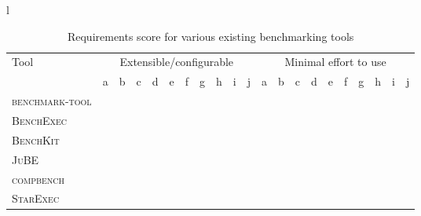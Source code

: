 \begin{table}
    \caption{Requirements score for various existing benchmarking tools}
    \label{tab:reqscoresummary}
    \begin{threeparttable}
        \begin{adjustbox}{max width=\textwidth}
            \begin{tabular}{l}
                \begin{tabular}{l | cccccccccc | cccccccccc}
                    \toprule
                    \multirow{2}{*}{Tool} &
                        \multicolumn{10}{c|}{Extensible/configurable} &
                        \multicolumn{10}{c}{Minimal effort to use}\\
                        & a & b & c & d & e & f & g & h & i & j &
                        a & b & c & d & e & f & g & h & i & j\\
                    \midrule
                    \textsc{benchmark-tool} &
                        & \checkmark & \checkmark & \checkmark & \checkmark & \checkmark & \checkmark & & \checkmark & \checkmark &
                        \checkmark & \checkmark & & & & \checkmark & & & &\\
                    \textsc{BenchExec} &
                        & & & \checkmark & \checkmark & & \checkmark & & \checkmark & &
                        \checkmark & \checkmark & \checkmark & \checkmark & & & & & \checkmark & \checkmark\\
                    \textsc{BenchKit} &
                        & \checkmark & & & \checkmark & & \checkmark & & \checkmark & &
                        & \checkmark & \checkmark & & & & & & \checkmark &\\
                    \textsc{JuBE} &
                        \checkmark & \checkmark & & \checkmark & \checkmark & \checkmark & \checkmark & \checkmark & \checkmark & \checkmark &
                        \checkmark & \checkmark & \checkmark & \checkmark & \checkmark & \checkmark & \checkmark & \checkmark & &\\
                    \textsc{compbench} &
                        \checkmark & \checkmark & & \checkmark & \checkmark & & \checkmark & \checkmark & \checkmark & &
                        \checkmark & & & & & \checkmark & & \checkmark & \checkmark &\\
                    \textsc{StarExec} &
                        \checkmark & \checkmark & \checkmark & & \checkmark & & \checkmark & & \checkmark & \checkmark &
                        \checkmark & \checkmark & \checkmark & \checkmark & & \checkmark & \checkmark & \checkmark & \checkmark & \checkmark\\

\end{tabular}
\end{tabular}
\end{adjustbox}
\end{threeparttable}
\end{table}
